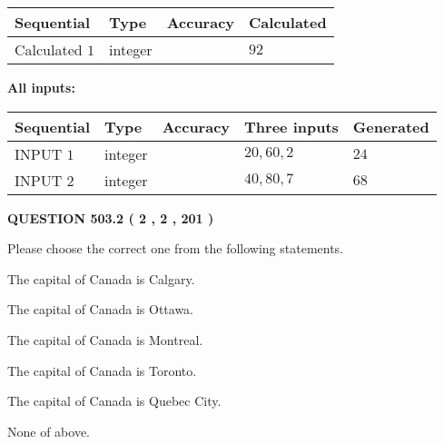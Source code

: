 \documentclass[12pt]{article}
\begin{document}
   
   
   
\noindent{}
   
   
  
  
\noindent\begin{tabular}{|l|l|l|l|}
\hline
 Sequential & Type & Accuracy & Calculated \\ 
\hline
 
 
  Calculated $  1 $ & integer &  & 
  $ 92 $ 
 \\  \hline  
 \end{tabular}
   
   
   
   
\noindent\vspace{0.1in}\hspace{-0.08in} {\textbf{\Large{All inputs: }}}
   
   
  
  
\noindent\begin{tabular}{|l|l|l|l|l|}
\hline
 Sequential & Type & Accuracy & Three inputs & Generated \\ 
\hline
 
 
  INPUT $  1 $ & integer &  & $
 20
 , 
 60
 , 
 2
 $ & $ 24 $ 
 \\  \hline  
 
 
  INPUT $  2 $ & integer &  & $
 40
 , 
 80
 , 
 7
 $ & $ 68 $ 
 \\  \hline  
 \end{tabular}
   
   
  
\vspace{0.2in}
  
{\textbf{\Large{QUESTION
503.2 
 ( 2 , 2 , 201 )
}}}
  
  
Please choose the correct one from the following statements.
 
 
The capital of Canada is Calgary.
 
 
The capital of Canada is Ottawa.
 
 
The capital of Canada is Montreal.
 
 
The capital of Canada is Toronto.
 
 
The capital of Canada is Quebec City.
 
 
 None of above.
 
 
\noindent{}
 
\end{document}
